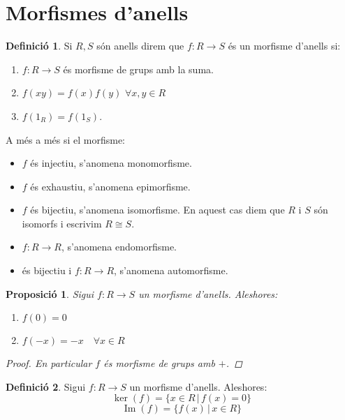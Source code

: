 \documentclass[a4paper,11pt]{report}
\newcommand{\barra}{\,|\,}
\theoremstyle{theorem}
\newtheorem{proposicio}{\normalfont \sffamily\bfseries Proposició}[section]
\theoremstyle{definition}
\newtheorem{definicio}{\normalfont\sffamily\bfseries Definició}[section]
\DeclareMathOperator{\ima}{Im}
\begin{document}
\section{Morfismes d'anells}
\begin{definicio}
	Si $R,S$ són anells direm que $f:R\longrightarrow S$ és un morfisme d'anells si:
	\begin{enumerate}
		\item $f:R\longrightarrow S$ és morfisme de grups amb la suma.
		\item $f(xy)=f(x)f(y)$ $\forall x,y\in R$
		\item $f(1_R)=f(1_S)$.
	\end{enumerate}
 A més a més si el morfisme:
	\begin{itemize}
		\item $f$ és injectiu, s'anomena monomorfisme.
		\item $f$ és exhaustiu, s'anomena epimorfisme.
		\item $f$ és bijectiu, s'anomena isomorfisme. En aquest cas diem que $R$ i $S$ són isomorfs i escrivim $R\cong S$.
		\item $f:R\longrightarrow R$, s'anomena endomorfisme.
		\item és bijectiu i $f:R\longrightarrow R$, s'anomena automorfisme.
	\end{itemize}
\end{definicio}
\begin{proposicio}
	Sigui $f:R\longrightarrow S$ un morfisme d'anells. Aleshores:\begin{enumerate}
		\item $f(0)=0$
		\item $f(-x)=-x\quad\forall x\in R$
	\end{enumerate}
\begin{proof}
	En particular $f$ és morfisme de grups amb $+$.
\end{proof}
\end{proposicio}
\begin{definicio}
		Sigui $f:R\longrightarrow S$ un morfisme d'anells. Aleshores:
		$$\ker(f)=\{x\in R\barra f(x)=0\}$$
		$$\ima(f)=\{f(x)\barra x\in R\}$$
\end{definicio}
\end{document}
